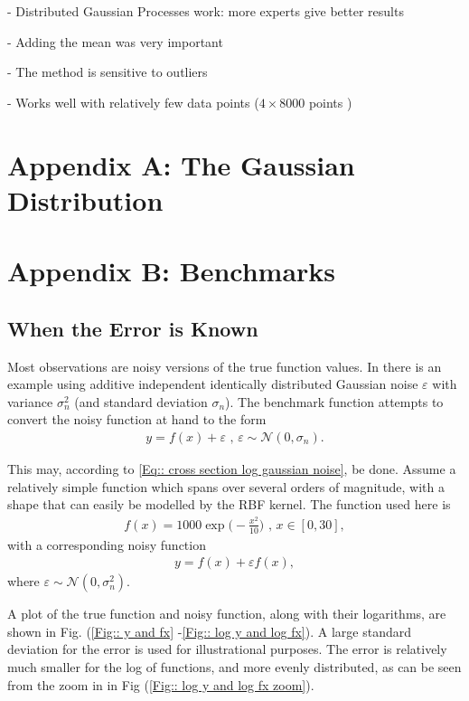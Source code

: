 \documentclass[twoside,english]{uiofysmaster}
\begin{document}
- Distributed Gaussian Processes work: more experts give better results

- Adding the mean was very important

- The method is sensitive to outliers

- Works well with relatively few data points ($4 \times 8000$ points )


\chapter*{Appendix A: The Gaussian Distribution}





\chapter*{Appendix B: Benchmarks}

\section{When the Error is Known}

Most observations are noisy versions of the true function values. In \cite{rasmussen2006gaussian} there is an example using additive independent identically distributed Gaussian noise $\varepsilon$ with variance $\sigma_n^2$ (and standard deviation $\sigma_n$). The benchmark function attempts to convert the noisy function at hand to the form
\begin{align}\label{Eq:: Gaussian noise}
y = f(x) + \varepsilon \text{ , } \varepsilon \sim  \mathcal{N} (0, \sigma_n).
\end{align}

This may, according to \ref{Eq:: cross section log gaussian noise}, be done. Assume a relatively simple function which spans over several orders of magnitude, with a shape that can easily be modelled by the RBF kernel. The function used here is
\begin{align}
f(x) =  1000 \exp \Big(-\frac{x^2}{10}\Big) \text{ , } x \in [0, 30],
\end{align} 
with a corresponding noisy function 
\begin{align}
y = f(x) + \varepsilon f(x),
\end{align}
where $\varepsilon \sim \mathcal{N} (0, \sigma_n^2)$.

A plot of the true function and noisy function, along with their logarithms, are shown in Fig. (\ref{Fig:: y and fx} -\ref{Fig:: log y and log fx}). A large standard deviation for the error is used for illustrational purposes. The error is relatively much smaller for the log of functions, and more evenly distributed, as can be seen from the zoom in in Fig (\ref{Fig:: log y and log fx zoom}).
\end{document}
